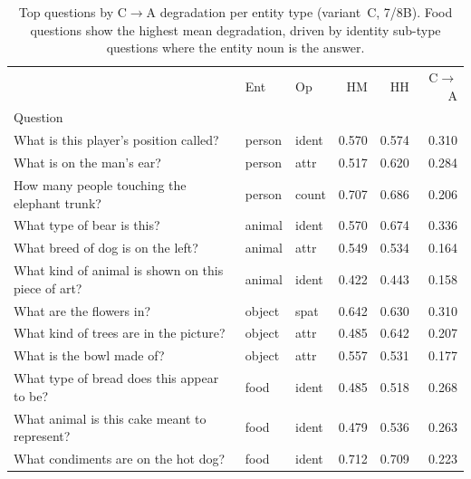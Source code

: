 \begin{table}[t]
\centering
\caption{Top questions by C$\to$A degradation per entity type (variant~C, 7/8B). Food questions show the highest mean degradation, driven by identity sub-type questions where the entity noun is the answer.}
\label{tab:qual_entity}
\small
\begin{tabular}{lllrrr}
\toprule
 & Ent & Op & HM & HH & C$\to$A \\
Question &  &  &  &  &  \\
\midrule
What is this player's position called? & person & ident & 0.570 & 0.574 & 0.310 \\
What is on the man's ear? & person & attr & 0.517 & 0.620 & 0.284 \\
How many people touching the elephant trunk? & person & count & 0.707 & 0.686 & 0.206 \\
What type of bear is this? & animal & ident & 0.570 & 0.674 & 0.336 \\
What breed of dog is on the left? & animal & attr & 0.549 & 0.534 & 0.164 \\
What kind of animal is shown on this piece of art? & animal & ident & 0.422 & 0.443 & 0.158 \\
What are the flowers in? & object & spat & 0.642 & 0.630 & 0.310 \\
What kind of trees are in the picture? & object & attr & 0.485 & 0.642 & 0.207 \\
What is the bowl made of? & object & attr & 0.557 & 0.531 & 0.177 \\
What type of bread does this appear to be? & food & ident & 0.485 & 0.518 & 0.268 \\
What animal is this cake meant to represent? & food & ident & 0.479 & 0.536 & 0.263 \\
What condiments are on the hot dog? & food & ident & 0.712 & 0.709 & 0.223 \\
\bottomrule
\end{tabular}
\end{table}

